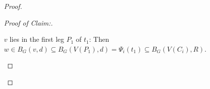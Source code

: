 \documentclass{patmorin}
\newenvironment{clmproof}{\begin{proof}[Proof of Claim:]\renewcommand{\qedsymbol}{\rule{1ex}{1ex}}}{\end{proof}}
\begin{document}
\begin{proof}
\begin{clmproof}
\begin{compactitem}
      \item $v$ lies in the first leg $P_1$ of $t_1$: Then $w\in B_G(v,d)\subseteq B_G(V(P_1),d)=\Psi_i(t_1)\subseteq B_G(V(C_i),R)$. \qedhere

\end{compactitem}
\end{clmproof}
\end{proof}
\end{document}
